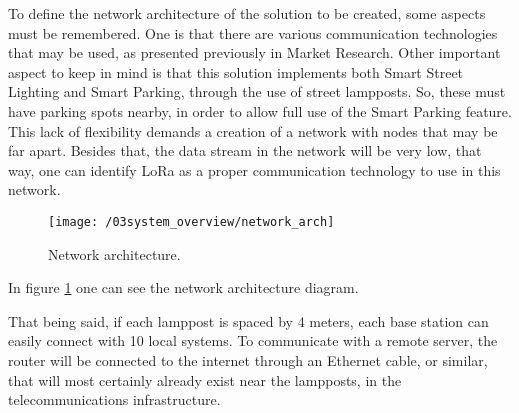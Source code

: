 To define the network architecture of the solution to be created, some aspects must be remembered. One is that there are various communication technologies that may be used, as presented previously in Market Research. Other important aspect to keep in mind is that this solution implements both Smart Street Lighting and Smart Parking, through the use of street lampposts. So, these must have parking spots nearby, in order to allow full use of the Smart Parking feature. This lack of flexibility demands a creation of a network with nodes that may be far apart. Besides that, the data stream in the network will be very low, that way, one can identify LoRa as a proper communication technology to use in this network.

\begin{figure}[ht]
	\centering
	\texttt{[image: /03system\_overview/network\_arch]}
	\caption{Network architecture.}
	\label{fig:network_arch}
\end{figure}

In figure \ref{fig:network_arch} one can see the network architecture diagram. 




That being said, if each lamppost is spaced by 4 meters, each base station can easily connect with 10 local systems. To communicate with a remote server, the router will be connected to the internet through an Ethernet cable, or similar, that will most certainly already exist near the lampposts, in the telecommunications infrastructure.

